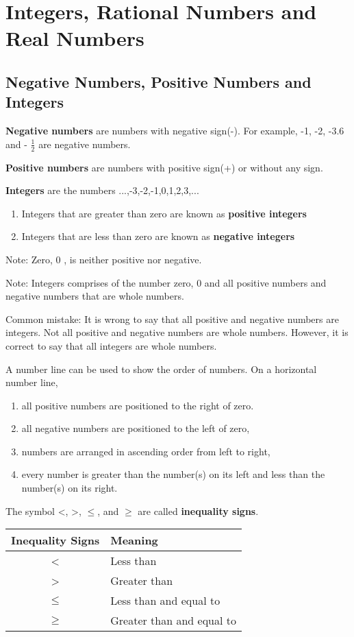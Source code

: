 \documentclass[../main]{subfiles}
\begin{document}
\section{Integers, Rational Numbers and Real Numbers}

\subsection{Negative Numbers, Positive Numbers and Integers}
\textbf{Negative numbers} are numbers with negative sign(-). For example, -1,
-2, -3.6 and - \(\frac 1 2 \) are negative numbers.

\textbf{Positive numbers} are numbers with positive sign(+) or without any sign.

\textbf{Integers} are the numbers ...,-3,-2,-1,0,1,2,3,...
\begin{enumerate}
\item Integers that are greater than zero are known as \textbf{positive
    integers}
\item Integers that are less than zero are known as \textbf{negative integers}
\end{enumerate}

Note: Zero, 0 , is neither positive nor negative.

Note: Integers comprises of the number zero, 0 and all positive numbers and
negative numbers that are whole numbers.

Common mistake:
It is wrong to say that all positive and negative numbers are integers. Not all
positive and negative numbers are whole numbers. However, it is correct to say
that all integers are whole numbers.

A number line can be used to show the order of numbers. On a horizontal number
line,
\begin{enumerate}
\item all positive numbers are positioned to the right of zero.
\item all negative numbers are positioned to the left of zero,
\item numbers are arranged in ascending order from left to right,
\item every number is greater than the number(s) on its left and less than the
  number(s) on its right.
  
\end{enumerate}

The symbol \textless , \textgreater ,  \(\leq\), and \(\geq\) are called \textbf{inequality signs}.
\begin{center}
  \begin{tabular}{| c| l |  }
    \hline
    Inequality Signs & Meaning \\ 
    \hline
    \textless & Less than \\  
    \hline
    \textgreater  & Greater than \\   
    \hline

    \(\leq \) & Less than and equal to \\   
    \hline
    \(\geq \) & Greater than and equal to \\   
    \hline
  \end{tabular}
\end{center}
\end{document}
